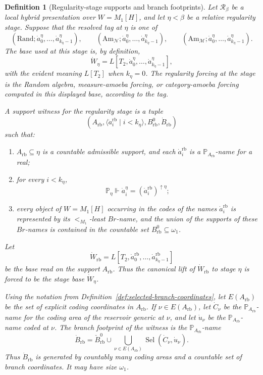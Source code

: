 \documentclass[a4paper,11pt]{article}
\newtheorem{definition}[theorem]{Definition}
\begin{document}
\begin{definition}[Regularity-stage supports and branch footprints]
\label{def:admissible-random-base}
Let \(\mathcal R_\beta\) be a local hybrid presentation over \(W=M_1[H]\), and
let \(\eta<\beta\) be a relative regularity stage.  Suppose that the resolved
tag at \(\eta\) is one of
\[
   (\mathrm{Rand};\dot a^\eta_0,\ldots,\dot a^\eta_{k_\eta-1}),
   \qquad
   (\mathrm{Am}_{\mathcal N};\dot a^\eta_0,\ldots,
      \dot a^\eta_{k_\eta-1}),
   \qquad
   (\mathrm{Am}_{\mathcal M};\dot a^\eta_0,\ldots,
      \dot a^\eta_{k_\eta-1}).
\]
The base used at this stage is, by definition,
\[
   \dot W_\eta=L[T_2,\dot a^\eta_0,\ldots,
      \dot a^\eta_{k_\eta-1}],
\]
with the evident meaning \(L[T_2]\) when \(k_\eta=0\).  The regularity forcing
at the stage is the Random algebra, measure-amoeba forcing, or category-amoeba
forcing computed in this displayed base, according to the tag.

A \emph{support witness} for the regularity stage is a tuple
\[
   (A_{\mathrm{rb}},
    \langle \dot a^{\mathrm{rb}}_i\mid i<k_\eta\rangle,
    B^0_{\mathrm{rb}},
    \dot B_{\mathrm{rb}})
\]
such that:
\begin{enumerate}
   \item \(A_{\mathrm{rb}}\subseteq\eta\) is a countable admissible support, and
   each \(\dot a^{\mathrm{rb}}_i\) is a \(\mathbb P_{A_{\mathrm{rb}}}\)-name for
   a real;

   \item for every \(i<k_\eta\),
   \[
      \mathbb P_\eta\Vdash
      \dot a^\eta_i=(\dot a^{\mathrm{rb}}_i)^{\uparrow\eta};
   \]

   \item every object of \(W=M_1[H]\) occurring in the codes of the names
   \(\dot a^{\mathrm{rb}}_i\) is represented by its \(<_{M_1}\)-least
   \(Br\)-name, and the union of the supports of these \(Br\)-names is
   contained in the countable set \(B^0_{\mathrm{rb}}\subseteq\omega_1\).
\end{enumerate}
Let
\[
   \dot W_{\mathrm{rb}}
   =L[T_2,
      \dot a^{\mathrm{rb}}_0,\ldots,
      \dot a^{\mathrm{rb}}_{k_\eta-1}]
\]
be the base read on the support \(A_{\mathrm{rb}}\).  Thus the canonical lift of
\(\dot W_{\mathrm{rb}}\) to stage \(\eta\) is forced to be the stage base
\(\dot W_\eta\).

Using the notation from Definition~\ref{def:selected-branch-coordinates}, let
\(E(A_{\mathrm{rb}})\) be the set of explicit coding coordinates in
\(A_{\mathrm{rb}}\).  If \(\nu\in E(A_{\mathrm{rb}})\), let \(\dot C_\nu\) be the
\(\mathbb P_{A_{\mathrm{rb}}}\)-name for the coding area of the reservoir
generic at \(\nu\), and let \(\dot u_\nu\) be the
\(\mathbb P_{A_{\mathrm{rb}}}\)-name coded at \(\nu\).  The branch footprint of
the witness is the \(\mathbb P_{A_{\mathrm{rb}}}\)-name
\[
   \dot B_{\mathrm{rb}}
   =
   \check B^0_{\mathrm{rb}}
   \cup
   \bigcup_{\nu\in E(A_{\mathrm{rb}})}
      \operatorname{Sel}(\dot C_\nu,\dot u_\nu).
\]
Thus \(\dot B_{\mathrm{rb}}\) is generated by countably many coding areas and a
countable set of branch coordinates.  It may have size \(\omega_1\).


\end{definition}
\end{document}
